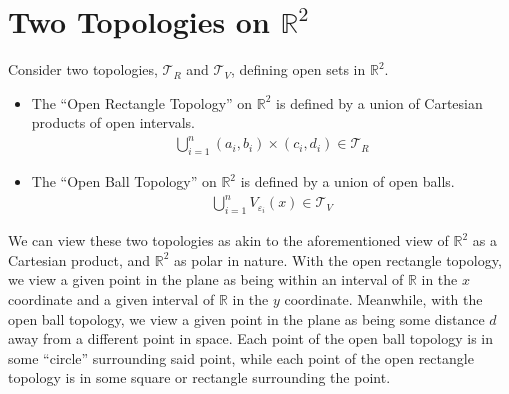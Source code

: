 \documentclass[12pt]{extarticle}
\newcommand{\R}{\mathbb{R}}
\begin{document}
  \section*{Two Topologies on $\R^2$}%
  Consider two topologies, $ \mathcal{T}_R $ and $ \mathcal{T}_V $, defining open sets in $\R^2$.
  \begin{itemize}
    \item The ``Open Rectangle Topology'' on $\R^2$ is defined by a union of Cartesian products of open intervals.
      \begin{align*}
        \bigcup_{i=1}^{n}(a_i,b_i)\times(c_i,d_i) \in \mathcal{T}_R
      \end{align*}
    \item The ``Open Ball Topology'' on $\R^2$ is defined by a union of open balls.
      \begin{align*}
        \bigcup_{i=1}^{n}V_{\varepsilon_i}(x) \in \mathcal{T}_V
      \end{align*}
  \end{itemize}
  We can view these two topologies as akin to the aforementioned view of $\R^2$ as a Cartesian product, and $\R^2$ as polar in nature. With the open rectangle topology, we view a given point in the plane as being within an interval of $\R$ in the $x$ coordinate and a given interval of $\R$ in the $y$ coordinate. Meanwhile, with the open ball topology, we view a given point in the plane as being some distance $d$ away from a different point in space. Each point of the open ball topology is in some ``circle'' surrounding said point, while each point of the open rectangle topology is in some square or rectangle surrounding the point.\\
\end{document}
